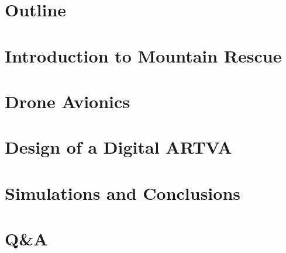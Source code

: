 \documentclass{beamer}
\begin{document}
\section*{Outline}


\section{Introduction to Mountain Rescue}
	\frame{\centering \tableofcontents[currentsection]}
	
	
	

\section{Drone Avionics}
	\frame{\centering \tableofcontents[currentsection]}
	
	
		
	
	
	
	

\section{Design of a Digital ARTVA}
	\frame{\centering \tableofcontents[currentsection]}
	
	
	
	
\section{Simulations and Conclusions}	
	\frame{\centering \tableofcontents[currentsection]}
	
	
	

\section*{Q\&A}
	
	
	

	
	

	

	
	
\end{document}

